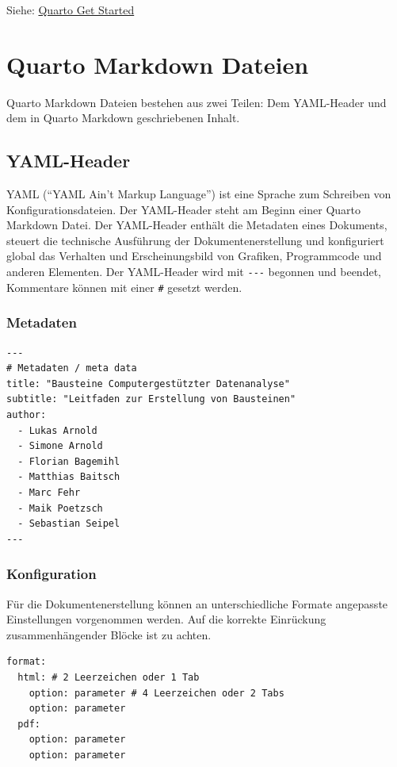 \documentclass[
  letterpaper,
  DIV=11]{scrartcl}
\begin{document}
Siehe: \href{https://quarto.org/docs/get-started/}{Quarto Get Started}

\section{Quarto Markdown Dateien}\label{sec-Quarto-Markdown-Dateien}

Quarto Markdown Dateien bestehen aus zwei Teilen: Dem YAML-Header und
dem in Quarto Markdown geschriebenen Inhalt.

\subsection{YAML-Header}\label{yaml-header}

YAML (``YAML Ain't Markup Language'') ist eine Sprache zum Schreiben von
Konfigurationsdateien. Der YAML-Header steht am Beginn einer Quarto
Markdown Datei. Der YAML-Header enthält die Metadaten eines Dokuments,
steuert die technische Ausführung der Dokumentenerstellung und
konfiguriert global das Verhalten und Erscheinungsbild von Grafiken,
Programmcode und anderen Elementen. Der YAML-Header wird mit
\texttt{-\/-\/-} begonnen und beendet, Kommentare können mit einer
\texttt{\#} gesetzt werden.

\subsubsection{Metadaten}\label{metadaten}

\begin{verbatim}
---
# Metadaten / meta data
title: "Bausteine Computergestützter Datenanalyse"
subtitle: "Leitfaden zur Erstellung von Bausteinen"
author:
  - Lukas Arnold
  - Simone Arnold
  - Florian Bagemihl
  - Matthias Baitsch
  - Marc Fehr
  - Maik Poetzsch
  - Sebastian Seipel
---
\end{verbatim}

\subsubsection{Konfiguration}\label{konfiguration}

Für die Dokumentenerstellung können an unterschiedliche Formate
angepasste Einstellungen vorgenommen werden. Auf die korrekte Einrückung
zusammenhängender Blöcke ist zu achten.

\begin{verbatim}
format:
  html: # 2 Leerzeichen oder 1 Tab
    option: parameter # 4 Leerzeichen oder 2 Tabs
    option: parameter
  pdf:  
    option: parameter  
    option: parameter
\end{verbatim}
\end{document}
